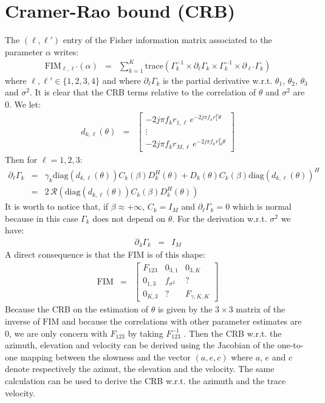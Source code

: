 \documentclass[a4paper, 12pt]{report}
\newcommand{\diag}[1]{\mathrm{diag}\left( #1 \right)}
\newcommand{\trace}[1]{\mathrm{trace}\left( #1 \right)}
\def\fim{\mathrm{FIM}}
\begin{document}
 \section{Cramer-Rao bound (CRB)}
The $(\ell,\ell')$ entry of the Fisher information matrix  associated to the parameter $\alpha$ writes:
\begin{eqnarray}
 \label{eq:FIM}
\fim_{\ell,\ell'}(\alpha)&=&\sum_{k=1}^{K}\trace{\Gamma_{k}^{-1}\times\partial_{\ell}\Gamma_{k}\times\Gamma_{k}^{-1}\times\partial_{\ell'}\Gamma_{k}}
\end{eqnarray}
where $\ell,\ell'\in\{1,2,3,4\}$ and where $\partial_{\ell}\Gamma_{k}$ is the partial derivative w.r.t. $\theta_{1}$, $\theta_{2}$, $\theta_{3}$ and $\sigma^{2}$.  It is clear that the CRB terms relative to the correlation of $\theta$ and $\sigma^{2}$ are 0. We let:
\begin{eqnarray*}
 d_{k,\ell}(\theta)&=&
  \begin{bmatrix}
  -2j\pi f_{k} r_{1,\ell}\,e^{-2j\pi f_{k}r_{1}^{T}\theta}
  \\
  \vdots
  \\
  -2j\pi f_{k} r_{M,\ell}\,e^{-2j\pi f_{k}r_{M}^{T}\theta}
  \end{bmatrix}
\end{eqnarray*}
Then for $\ell=1,2,3$:
\begin{eqnarray*}
\partial_{\ell}\Gamma_{k}&=&\gamma_{k}
   \diag{d_{k,\ell}(\theta)}C_{k}(\beta)D_{k}^{H}(\theta)+
   D_{k}(\theta)C_{k}(\beta) \diag{d_{k,\ell}(\theta)}^{H}
   \\
   &=&2\, \mathcal{R}\left(
   \diag{d_{k,\ell}(\theta)}C_{k}(\beta)D_{k}^{H}(\theta)\right)
\end{eqnarray*}
It is worth to notice that, if $\beta\approx +\infty$, $C_{k}=I_{M}$ and $\partial_{\ell}\Gamma_{k}=0$ which is normal because in this case $\Gamma_{k}$ does not depend on $\theta$. For the derivation w.r.t. $\sigma^{2}$ we have:
\begin{eqnarray*}
\partial_{4}\Gamma_{k}&=&I_{M}
\end{eqnarray*}
A direct consequence is that the FIM is of this shape:
\begin{eqnarray*}
 \fim&=&\begin{bmatrix}
 F_{123}&0_{3,1}&0_{3,K}
 \\
 0_{1,3}&f_{\sigma^{2}}&?
 \\
 0_{K,3}&?&F_{\gamma,K,K}
 \end{bmatrix}
\end{eqnarray*}
Because the CRB on the estimation of $\theta$ is given by the $3\times 3$ matrix of the inverse of $\fim$ and because the correlations with other parameter estimates are 0, we are only concern with $ F_{123}$ by taking $ F_{123}^{-1}$ . Then the CRB w.r.t. the azimuth, elevation and velocity can be derived using the Jacobian of the one-to-one mapping between the slowness and the vector $(a,e,c)$ where $a$, $e$ and $c$ denote respectively the azimut, the elevation and the velocity. The same calculation can be used to derive the CRB w.r.t. the azimuth and the trace velocity.
\end{document}
